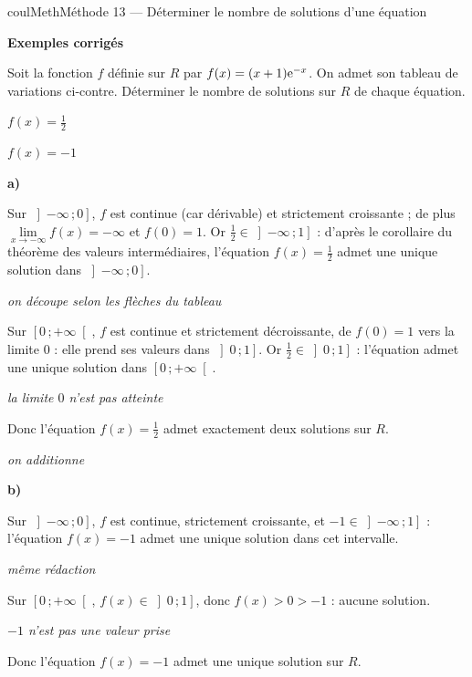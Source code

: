 \documentclass[11pt,a4paper]{article}
\makeatletter
\newcommand{\R}{\mathbb{R}}
\newcommand{\N}{\mathbb{N}}
\newcommand{\Z}{\mathbb{Z}}
\newcommand{\Q}{\mathbb{Q}}
\newcommand{\vect}[1]{\overrightarrow{#1}}
\newcommand{\fois}[1]{\times{\color{coulExo}#1}}
\newcommand{\lycee@intfo}[2]{\left[#1\,;#2\right[}
\newcommand{\lycee@intof}[2]{\left]#1\,;#2\right]}
\providecommand{\Cf}{\mathcal{C}\sb{f}}%
\providecommand{\Cg}{\mathcal{C}\sb{g}}%
\providecommand{\intfo}{\lycee@intfo}%
\providecommand{\intof}{\lycee@intof}%
\newcounter{lycee@signet}
\newcommand{\signet}[3][]{\stepcounter{lycee@signet}%
  \edef\lycee@dest{\if\relax\detokenize{#1}\relax
    signet.\arabic{lycee@signet}\else#1\fi}%
  \hypertarget{\lycee@dest}{}\bookmark[level=#2,dest=\lycee@dest]{#3}}
\def\R{R}\def\N{N}\def\Z{Z}\def\Q{Q}\def\vect#1{#1}\def\Cf{Cf}\def\Cg{Cg}\def\fois#1{×#1}%
\newcommand{\res}[1]{#1}
\newcounter{methode}
\newenvironment{methodebox}[1][Méthode]{\stepcounter{methode}%
  \begin{boitecours}[phantom={\signet[methode-\arabic{methode}]{2}{#1}}]{coulMeth}{#1}}%
  {\end{boitecours}}
\newcommand{\etape}[1]{\par\smallskip\textbf{\color{coulMeth}#1}\par\nobreak\smallskip}
\newcommand{\explique}[2]{\par\smallskip\noindent
  \begin{minipage}[t]{0.57\linewidth}\raggedright #1\end{minipage}\hfill
  \begin{minipage}[t]{0.40\linewidth}\raggedright\leavevmode
    {\small\itshape\color{black!60}#2}\end{minipage}\par}
\newcommand{\cas}[1]{\par\smallskip\noindent\textbf{\color{coulExo}#1}\vadjust{\nobreak}}
\newenvironment{correction}{\par}{\par}
\newcommand{\etapeexemples}{\etape{Exemples corrigés}}
\makeatother
\begin{document}
\begin{methodebox}[Méthode 13 --- Déterminer le nombre de solutions d'une équation]
\etapeexemples
\begin{minipage}[c]{0.5\linewidth}\raggedright
Soit la fonction $f$ définie sur $\R$ par $f(x)=(x+1)\mathrm{e}^{-x}$. On admet son tableau de
variations ci-contre. Déterminer le nombre de solutions sur $\R$ de chaque équation.
\begin{questions}[label=\alph*)]
  \item $f(x)=\frac{1}{2}$
  \item $f(x)=-1$
\end{questions}
\end{minipage}\hfill
\begin{minipage}[c]{0.46\linewidth}\centering
{}
\end{minipage}
\begin{correction}
\cas{a)}
\explique{Sur $\intof{-\infty}{0}$, $f$ est continue (car dérivable) et strictement
croissante ; de plus $\lim\limits_{x\to-\infty}f(x)=-\infty$ et $f(0)=1$. Or
$\frac{1}{2}\in\intof{-\infty}{1}$ : d'après le corollaire du théorème des valeurs
intermédiaires, l'équation $f(x)=\frac{1}{2}$ admet une unique solution dans
$\intof{-\infty}{0}$.}{on découpe selon les flèches du tableau}
\explique{Sur $\intfo{0}{+\infty}$, $f$ est continue et strictement décroissante, de
$f(0)=1$ vers la limite $0$ : elle prend ses valeurs dans $\intof{0}{1}$. Or
$\frac{1}{2}\in\intof{0}{1}$ : l'équation admet une unique solution dans
$\intfo{0}{+\infty}$.}{la limite $0$ n'est pas atteinte}
\explique{Donc l'équation $f(x)=\frac{1}{2}$ admet \res{exactement deux solutions} sur
$\R$.}{on additionne}
\cas{b)}
\explique{Sur $\intof{-\infty}{0}$, $f$ est continue, strictement croissante, et
$-1\in\intof{-\infty}{1}$ : l'équation $f(x)=-1$ admet une unique solution dans cet
intervalle.}{même rédaction}
\explique{Sur $\intfo{0}{+\infty}$, $f(x)\in\intof{0}{1}$, donc $f(x)>0>-1$ : aucune
solution.}{$-1$ n'est pas une valeur prise}
\explique{Donc l'équation $f(x)=-1$ admet \res{une unique solution} sur $\R$.}{}
\end{correction}


\end{methodebox}
\end{document}
